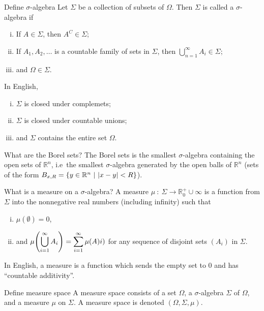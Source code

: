 \documentclass[avery5388,grid,frame]{flashcards}
\newcommand{\f}[3]{#1\ :\ #2 \rightarrow #3}
\def\Rl{\mathbb{R}}
\begin{document}
\begin{flashcard}
    {Define $\sigma$-algebra}
    Let $\Sigma$ be a collection of subsets of $\Omega$.  Then $\Sigma$ is called a $\sigma$-algebra if
    \begin{enumerate}[(i)]
        \item If $A \in \Sigma$, then $A^C \in \Sigma$;
        \item If $A_1, A_2,\dots$ is a countable family of sets in $\Sigma$, then $\bigcup_{n=1}^\infty A_i \in \Sigma$;
        \item and $\Omega \in \Sigma$.
    \end{enumerate}

    In English,
    \begin{enumerate}[(i)]
        \item $\Sigma$ is closed under complemets;
        \item $\Sigma$ is closed under countable unions;
        \item and $\Sigma$ contains the entire set $\Omega$.
    \end{enumerate}
\end{flashcard}

\begin{flashcard}
    {What are the Borel sets?}
    The Borel sets is the smallest $\sigma$-algebra containing the open sets of $\Rl^n$, i.e~the smallest $\sigma$-algebra generated by the open balls of $\Rl^n$ (sets of the form $B_{x,R} = \left\{y \in \Rl^n\ |\ \abs{x - y} < R\right\}$).
\end{flashcard}

\begin{flashcard}
    {What is a measure on a $\sigma$-algebra?}
    A measure $\f{\mu}{\Sigma}{\Rl_0^+ \cup \infty}$ is a function from $\Sigma$ into the nonnegative real numbers (including infinity) such that
    \begin{enumerate}[(i)]
        \item $\mu(\emptyset) = 0$,
        \item and $\displaystyle\mu\qty(\bigcup_{i=1}^\infty A_i) = \sum_{i=1}^\infty \mu(A)i)$ for any sequence of disjoint sets $(A_i)$ in $\Sigma$.
    \end{enumerate}

    In English, a measure is a function which sends the empty set to $0$ and has ``countable additivity''.
\end{flashcard}

\begin{flashcard}
    {Define measure space}
    A measure space consists of a set $\Omega$, a $\sigma$-algebra $\Sigma$ of $\Omega$, and a measure $\mu$ on $\Sigma$.  A measure space is denoted $(\Omega, \Sigma, \mu)$.
\end{flashcard}
\end{document}
